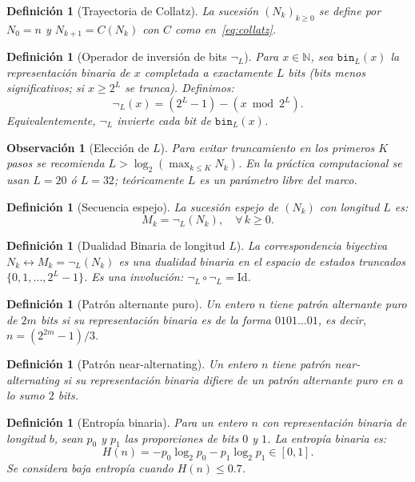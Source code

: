 \documentclass[11pt,a4paper]{article}
\newtheorem{definition}[theorem]{Definición}
\newtheorem{remark}[theorem]{Observación}
\begin{document}
\begin{definition}[Trayectoria de Collatz]
La sucesión $(N_k)_{k \ge 0}$ se define por $N_0 = n$ y
$N_{k+1} = C(N_k)$ con $C$ como en~\eqref{eq:collatz}.
\end{definition}

\begin{definition}[Operador de inversión de bits $\neg_L$]
\label{def:inversion}
Para $x \in \mathbb{N}$, sea $\mathtt{bin}_L(x)$ la representación
binaria de $x$ completada a exactamente $L$ bits (bits menos
significativos; si $x \ge 2^L$ se trunca). Definimos:
\[
  \neg_L(x) = (2^L - 1) - (x \bmod 2^L).
\]
Equivalentemente, $\neg_L$ invierte cada bit de $\mathtt{bin}_L(x)$.
\end{definition}

\begin{remark}[Elección de $L$]
Para evitar truncamiento en los primeros $K$ pasos se recomienda
$L > \log_2(\max_{k \le K} N_k)$.
En la práctica computacional se usan $L = 20$ ó $L = 32$;
teóricamente $L$ es un parámetro libre del marco.
\end{remark}

\begin{definition}[Secuencia espejo]
\label{def:espejo}
La sucesión espejo de $(N_k)$ con longitud $L$ es:
\[
  M_k = \neg_L(N_k), \quad \forall\, k \ge 0.
\]
\end{definition}

\begin{definition}[Dualidad Binaria de longitud $L$]
La correspondencia biyectiva $N_k \leftrightarrow M_k = \neg_L(N_k)$
es una \emph{dualidad binaria} en el espacio de estados truncados
$\{0,1,\dots,2^L-1\}$.
Es una involución: $\neg_L \circ \neg_L = \mathrm{Id}$.
\end{definition}

\begin{definition}[Patrón alternante puro]
\label{def:alternante}
Un entero $n$ tiene \emph{patrón alternante puro de $2m$ bits}
si su representación binaria es de la forma $0101\dots01$,
es decir, $n = (2^{2m}-1)/3$.
\end{definition}

\begin{definition}[Patrón near-alternating]
Un entero $n$ tiene \emph{patrón near-alternating} si su
representación binaria difiere de un patrón alternante puro
en a lo sumo $2$ bits.
\end{definition}

\begin{definition}[Entropía binaria]
Para un entero $n$ con representación binaria de longitud $b$,
sean $p_0$ y $p_1$ las proporciones de bits $0$ y $1$. La
\emph{entropía binaria} es:
\[
  H(n) = -p_0 \log_2 p_0 - p_1 \log_2 p_1 \in [0,1].
\]
Se considera \emph{baja entropía} cuando $H(n) \le 0.7$.
\end{definition}
\end{document}
